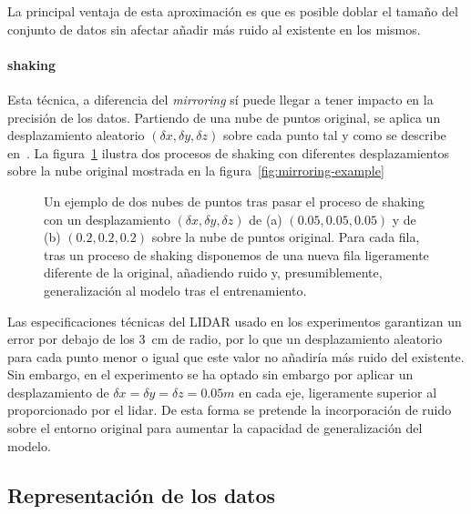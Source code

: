 La principal ventaja de esta aproximación es que es posible doblar el tamaño del conjunto de datos sin afectar añadir más ruido al existente en los mismos.

\paragraph{shaking}

Esta técnica, a diferencia del \textit{mirroring} sí puede llegar a tener impacto en la precisión de los datos. Partiendo de una nube de puntos original, se aplica un desplazamiento aleatorio $(\delta x, \delta y, \delta z)$ sobre cada punto tal y como se describe en~\cite{EL PAPER CUANDO NOS LO PUBLIQUEN}. La figura~\ref{fig:shaking-example} ilustra dos procesos de shaking con diferentes desplazamientos sobre la nube original mostrada en la figura~\ref{fig:mirroring-example}

\begin{figure}
	\centering
	\qquad
	\caption[Ejemplo de la técnica de \textit{shaking}]{Un ejemplo de dos nubes de puntos tras pasar el proceso de shaking con un desplazamiento $(\delta x, \delta y, \delta z)$ de (a) $(0.05, 0.05, 0.05)$ y de (b) $(0.2, 0.2, 0.2)$ sobre la nube de puntos original. Para cada fila, tras un proceso de shaking disponemos de una nueva fila ligeramente diferente de la original, añadiendo ruido y, presumiblemente, generalización al modelo tras el entrenamiento.}
	\label{fig:shaking-example}
\end{figure}

Las especificaciones técnicas del LIDAR usado en los experimentos garantizan un error por debajo de los \SI{3}{\cm} de radio, por lo que un desplazamiento aleatorio para cada punto menor o igual que este valor no añadiría más ruido del existente. Sin embargo, en el experimento se ha optado sin embargo por aplicar un desplazamiento de $\delta x = \delta y = \delta z = 0.05m$ en cada eje, ligeramente superior al proporcionado por el lidar. De esta forma se pretende la incorporación de ruido sobre el entorno original para aumentar la capacidad de generalización del modelo.

\subsection{Representación de los datos}

